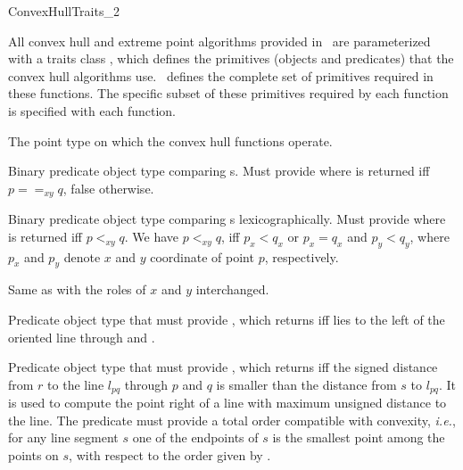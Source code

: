 

\begin{ccRefConcept}{ConvexHullTraits_2}

\ccDefinition
  
All convex hull and extreme point algorithms provided in \cgal\ are
parameterized with a traits class , which defines the
primitives (objects and predicates) that the convex hull algorithms use.
\ccRefName\ defines the complete set of primitives required in these
functions.  The specific subset of these primitives required by each function
is specified with each function.

\ccTypes
\ccAutoIndexingOff
{}

%
       {The point type on which the convex hull functions operate.}

%
       {Binary predicate object type comparing s.  Must provide 
         where 
        is returned iff $p ==_{xy} q$, false otherwise.
       }

%
       {Binary predicate object type comparing s
        lexicographically.  Must provide 
         where 
        is returned iff $p <_{xy} q$.
        We have $p<_{xy}q$, iff $p_x < q_x$ or $p_x = q_x$ and $p_y < q_y$,
        where $p_x$ and $p_y$ denote $x$ and $y$ coordinate of point $p$,
        respectively.
       }

%
       {Same as  with the roles of $x$ and $y$ interchanged.}

%
       {Predicate object type that must provide
        , which
        returns  iff  lies to the left of the
        oriented line through  and .}

%
       {Predicate object type that must provide 
        , which returns  iff
        the signed distance from $r$ to the line $l_{pq}$ through $p$ and $q$
        is smaller than the distance from $s$ to $l_{pq}$. It is used to
        compute the point right of a line with maximum unsigned distance to
        the line. The predicate must provide a total order compatible
        with convexity, {\it i.e.}, for any line segment $s$ one of the 
        endpoints 
        of $s$ is the smallest point among the points on $s$, with respect to
        the order given by .}


\end{ccRefConcept}
